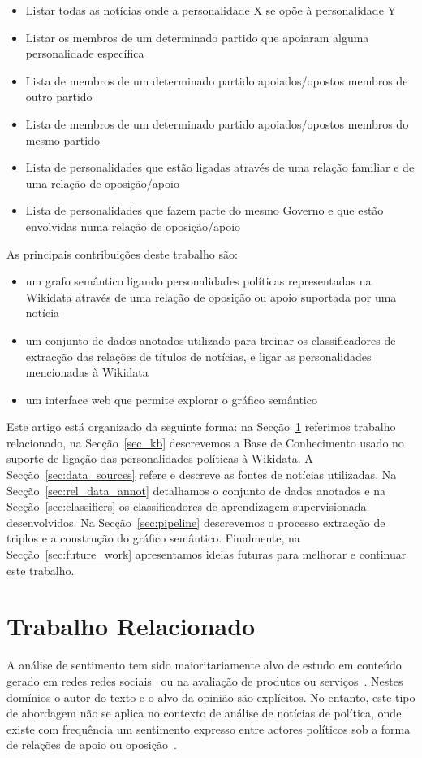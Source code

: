 \documentclass[a4paper, twocolumn, 11pt, twoside]{article}
\begin{document}
\begin{itemize}
\item{Listar todas as notícias onde a personalidade X se opõe à personalidade Y}
\item{Listar os membros de um determinado partido que apoiaram alguma personalidade específica}
\item{Lista de membros de um determinado partido apoiados/opostos membros de outro partido}
\item{Lista de membros de um determinado partido apoiados/opostos membros do mesmo partido}
\item{Lista de personalidades que estão ligadas através de uma relação familiar e de uma relação de oposição/apoio}
\item{Lista de personalidades que fazem parte do mesmo Governo e que estão envolvidas numa relação de oposição/apoio}
\end{itemize}

As principais contribuições deste trabalho são: 

\begin{itemize}
\item{um grafo semântico ligando personalidades políticas representadas na Wikidata através de uma relação de oposição ou apoio suportada por uma notícia}
\item{um conjunto de dados anotados utilizado para treinar os classificadores de extracção das relações de títulos de notícias, e ligar as personalidades mencionadas à Wikidata}
\item{um interface web que permite explorar o gráfico semântico}
\end{itemize}

Este artigo está organizado da seguinte forma: na Secção~\ref{sec_related_work} referimos trabalho relacionado, na Secção~\ref{sec_kb} descrevemos a Base de Conhecimento usado no suporte de ligação das personalidades políticas à Wikidata. A Secção~\ref{sec:data_sources} refere e descreve as fontes de notícias utilizadas. Na Secção~\ref{sec:rel_data_annot} detalhamos o conjunto de dados anotados e na Secção~\ref{sec:classifiers} os classificadores de aprendizagem supervisionada desenvolvidos. Na Secção~\ref{sec:pipeline} descrevemos o processo extracção de triplos e a construção do gráfico semântico. Finalmente, na Secção~\ref{sec:future_work} apresentamos ideias futuras para melhorar e continuar este trabalho.

\section{Trabalho Relacionado}
\label{sec_related_work}
A análise de sentimento tem sido maioritariamente alvo de estudo em conteúdo gerado em redes redes sociais~\citep{10.1145/3185045} ou na avaliação de produtos ou serviços~\citep{pontiki-etal-2016-semeval}. Nestes domínios o autor do texto e o alvo da opinião são explícitos. No entanto, este tipo de abordagem não se aplica no contexto de análise de notícias de política, onde existe com frequência um sentimento expresso entre actores políticos sob a forma de relações de apoio ou oposição~\citep{balahur2009opinion, balahur-etal-2010-sentiment}.
\end{document}
